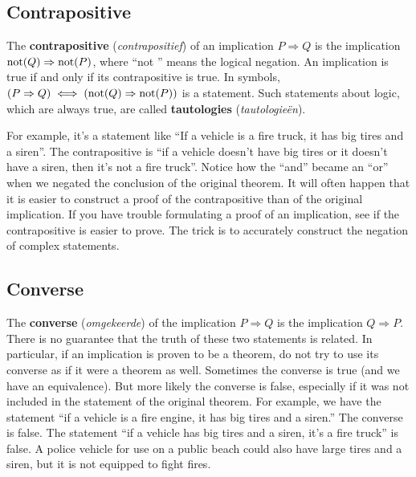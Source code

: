 \subsection{Contrapositive}
The \textbf{contrapositive} (\textit{contrapositief}) of an implication $P\Rightarrow Q$ is the implication ${\rm not}(Q)\Rightarrow{\rm not}(P)$, where ``not '' means the logical negation. An implication is true if and only if its contrapositive is true. In symbols, $(P\Rightarrow Q)\iff({\rm not}(Q)\Rightarrow{\rm not}(P))$ is a statement. Such statements about logic, which are always true, are called \textbf{tautologies} (\textit{tautologie\"en}).

For example, it's a statement like ``If a vehicle is a fire truck, it has big tires and a siren''. The contrapositive is ``if a vehicle doesn't have big tires or it doesn't have a siren, then it's not a fire truck''. Notice how the ``and'' became an ``or'' when we negated the conclusion of the original theorem.
%
It will often happen that it is easier to construct a proof of the contrapositive than of the original implication. If you have trouble formulating a proof of an implication, see if the contrapositive is easier to prove. The trick is to accurately construct the negation of complex statements.

\subsection{Converse}
The \textbf{converse} (\textit{omgekeerde}) of the implication $P\Rightarrow Q$ is the implication $Q\Rightarrow P$. There is no guarantee that the truth of these two statements is related. In particular, if an implication is proven to be a theorem, do not try to use its converse as if it were a theorem as well. Sometimes the converse is true (and we have an equivalence). But more likely the converse is false, especially if it was not included in the statement of the original theorem.  
%
For example, we have the statement ``if a vehicle is a fire engine, it has big tires and a siren.'' The converse is false. The statement ``if a vehicle has big tires and a siren, it's a fire truck'' is false. A police vehicle for use on a public beach could also have large tires and a siren, but it is not equipped to fight fires.
%

